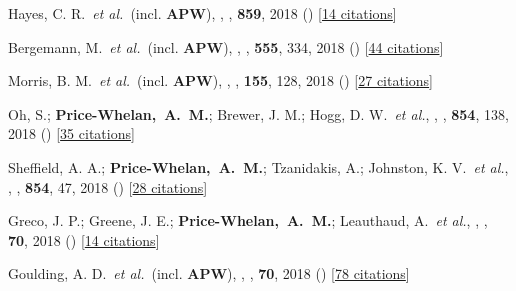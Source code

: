 \item[{\color{deemph}\scriptsize39}]Hayes, C. R.~\textit{et al.}~(incl. \textbf{APW}), , \apj, \textbf{859}, 2018 () [\href{http://adsabs.harvard.edu/abs/2018ApJ...859L...8H}{14 citations}]

\item[{\color{deemph}\scriptsize38}]Bergemann, M.~\textit{et al.}~(incl. \textbf{APW}), , \nature, \textbf{555}, 334, 2018 () [\href{http://adsabs.harvard.edu/abs/2018Natur.555..334B}{44 citations}]

\item[{\color{deemph}\scriptsize37}]Morris, B. M.~\textit{et al.}~(incl. \textbf{APW}), , \aj, \textbf{155}, 128, 2018 () [\href{http://adsabs.harvard.edu/abs/2018AJ....155..128M}{27 citations}]

\item[{\color{deemph}\scriptsize36}]Oh, S.; \textbf{Price-Whelan,~A.~M.}; Brewer, J. M.; Hogg, D. W.~\textit{et al.}, , \apj, \textbf{854}, 138, 2018 () [\href{http://adsabs.harvard.edu/abs/2018ApJ...854..138O}{35 citations}]

\item[{\color{deemph}\scriptsize35}]Sheffield, A. A.; \textbf{Price-Whelan,~A.~M.}; Tzanidakis, A.; Johnston, K. V.~\textit{et al.}, , \apj, \textbf{854}, 47, 2018 () [\href{http://adsabs.harvard.edu/abs/2018ApJ...854...47S}{28 citations}]

\item[{\color{deemph}\scriptsize34}]Greco, J. P.; Greene, J. E.; \textbf{Price-Whelan,~A.~M.}; Leauthaud, A.~\textit{et al.}, , \pasj, \textbf{70}, 2018 () [\href{http://adsabs.harvard.edu/abs/2018PASJ...70S..19G}{14 citations}]

\item[{\color{deemph}\scriptsize33}]Goulding, A. D.~\textit{et al.}~(incl. \textbf{APW}), , \pasj, \textbf{70}, 2018 () [\href{http://adsabs.harvard.edu/abs/2018PASJ...70S..37G}{78 citations}]

